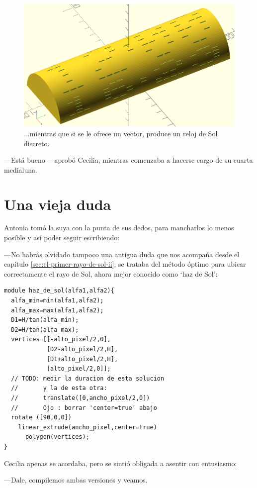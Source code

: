 \begin{figure}[ht]
  \centering
  \includegraphics[width=.83\textwidth]{imagenes/reloj-de-sol-discreto-2}  
  \caption{...mientras que si se le ofrece un vector, produce un reloj de Sol discreto.}
  \label{fig:reloj-de-sol-discreto-2}
\end{figure}


---Está bueno ---aprobó Cecilia, mientras comenzaba a hacerse cargo de
su cuarta medialuna.

\section{Una vieja duda}

Antonia tomó la suya con la punta de sus dedos, para mancharlos lo
menos posible y así poder seguir escribiendo:

---No habrás olvidado tampoco una antigua duda que nos acompaña desde
el capítulo \ref{sec:el-primer-rayo-de-sol-ii}; se trataba del método
óptimo para ubicar correctamente el rayo de Sol, ahora mejor conocido
como `haz de Sol':

\begin{lstlisting}
module haz_de_sol(alfa1,alfa2){
  alfa_min=min(alfa1,alfa2);
  alfa_max=max(alfa1,alfa2);
  D1=H/tan(alfa_min);
  D2=H/tan(alfa_max);
  vertices=[[-alto_pixel/2,0],
            [D2-alto_pixel/2,H],
            [D1+alto_pixel/2,H],
            [alto_pixel/2,0]];
  // TODO: medir la duracion de esta solucion
  //       y la de esta otra:
  //       translate([0,ancho_pixel/2,0])
  //       Ojo : borrar 'center=true' abajo
  rotate ([90,0,0])
    linear_extrude(ancho_pixel,center=true)
      polygon(vertices);
}
\end{lstlisting}
  
Cecilia apenas se acordaba, pero se sintió obligada a asentir con
entusiasmo:

---Dale, compilemos ambas versiones y veamos.

